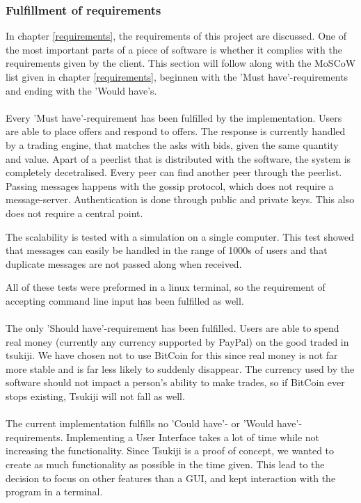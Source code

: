 \subsubsection{Fulfillment of requirements}
\label{requirementsfill}
In chapter \ref{requirements}, the requirements of this project are discussed. 
One of the most important parts of a piece of software is whether it complies with the requirements given by the client.
This section will follow along with the MoSCoW list given in chapter \ref{requirements}, beginnen with the 'Must have'-requirements and ending with the 'Would have's. \\
\\
Every 'Must have'-requirement has been fulfilled by the implementation.
Users are able to place offers and respond to offers. 
The response is currently handled by a trading engine, that matches the asks with bids, given the same quantity and value.
Apart of a peerlist that is distributed with the software, the system is completely decetralised. 
Every peer can find another peer through the peerlist.
Passing messages happens with the gossip protocol, which does not require a message-server.
Authentication is done through public and private keys.
This also does not require a central point.

The scalability is tested with a simulation on a single computer.
This test showed that messages can easily be handled in the range of 1000s of users and that duplicate messages are not passed along when received.

All of these tests were preformed in a linux terminal, so the requirement of accepting command line input has been fulfilled as well.\\
\\
The only 'Should have'-requirement has been fulfilled.
Users are able to spend real money (currently any currency supported by PayPal) on the good traded in tsukiji.
We have chosen not to use BitCoin for this since real money is not far more stable and is far less likely to suddenly disappear. 
The currency used by the software should not impact a person's ability to make trades, so if BitCoin ever stops existing, Tsukiji will not fall as well.\\
\\
The current implementation fulfills no 'Could have'- or 'Would have'-requirements.
Implementing a User Interface takes a lot of time while not increasing the functionality.
Since Tsukiji is a proof of concept, we wanted to create as much functionality as possible in the time given.
This lead to the decision to focus on other features than a GUI, and kept interaction with the program in a terminal.

